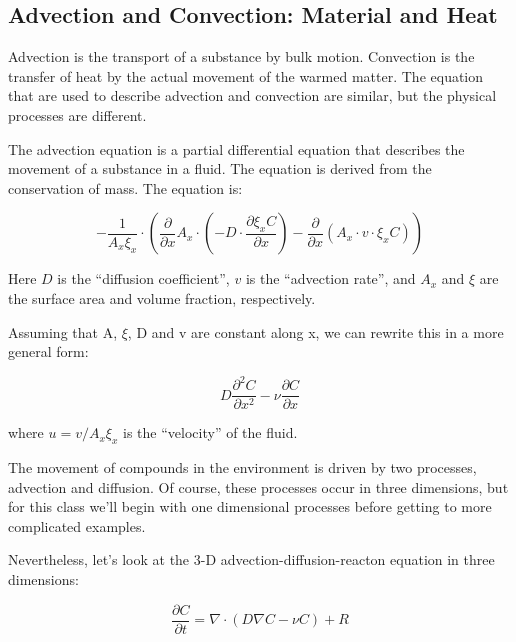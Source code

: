 \documentclass{tufte-handout}\usepackage[]{graphicx}\usepackage[]{xcolor}
\begin{document}
\subsection{Advection and Convection: Material and Heat}

Advection is the transport of a substance by bulk motion. Convection is the transfer of heat by the actual movement of the warmed matter. The equation that are used to describe advection and convection are similar, but the physical processes are different.




The advection equation is a partial differential equation that describes the movement of a substance in a fluid. The equation is derived from the conservation of mass. The equation is:


\begin{equation}
- \frac{1}{A_x \xi_x} \cdot \left( \frac{\partial}{\partial x} A_x \cdot \left( -D \cdot \frac{\partial \xi_x C}{\partial x} \right) - \frac{\partial}{\partial x} \left( A_x \cdot v \cdot \xi_x C \right) \right)
\end{equation}

Here $D$ is the ``diffusion coefficient'', $v$ is the ``advection rate'', and $A_x$ and $\xi$ are the surface area and volume fraction, respectively. 

Assuming that A, $\xi$, D and v are constant along x, we can rewrite this in a more general form: 

\begin{equation}
D \frac{\partial^2 C}{\partial x^2} - \nu \frac{\partial C}{\partial x}
\end{equation}

where $u = v/A_x \xi_x$ is the ``velocity'' of the fluid.

The movement of compounds in the environment is driven by two processes, advection and diffusion. Of course, these processes occur in three dimensions, but for this class we'll begin with one dimensional processes before getting to more complicated examples.

Nevertheless, let's look at the 3-D advection-diffusion-reacton equation in three dimensions:

\begin{equation}
\frac{\partial C}{\partial t} = \nabla \cdot (D\nabla C - \nu C) + R
\end{equation}
\end{document}
